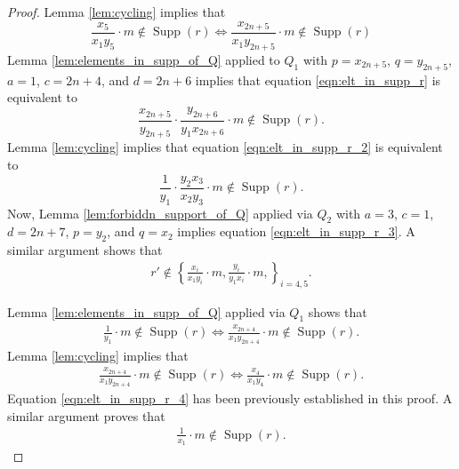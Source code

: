 \documentclass[12pt,a4paper]{amsart}
\theoremstyle{plain}
\theoremstyle{definition}
\def\bproof{\begin{proof}}
\def\eproof{\end{proof}}
\theoremstyle{remark}
\DeclareMathOperator{\Supp}{Supp}
\begin{document}
\bproof
Lemma \ref{lem:cycling} implies that
\begin{equation}
    \label{eqn:elt_in_supp_r}
    \frac{x_{5}}{x_{1}y_{5}} \cdot m \notin \Supp(r) \iff \frac{x_{2n+5}}{x_{1}y_{2n+5}} \cdot m \notin \Supp(r)
\end{equation}
Lemma \ref{lem:elements_in_supp_of_Q} applied to $Q_{1}$ with $p = x_{2n+5}$, $q = y_{2n+5}$, $a = 1$, $c = 2n+4$, and $d = 2n+6$ implies that equation \eqref{eqn:elt_in_supp_r} is equivalent to 
\begin{equation}
    \label{eqn:elt_in_supp_r_2}
    \frac{x_{2n+5}}{y_{2n+5}}\cdot  \frac{y_{2n+6}}{y_{1}x_{2n+6}} \cdot m \notin \Supp(r).
\end{equation}
Lemma \ref{lem:cycling} implies that equation \eqref{eqn:elt_in_supp_r_2} is equivalent to 
\begin{equation}
    \label{eqn:elt_in_supp_r_3}
    \frac{1}{y_{1}} \cdot \frac{y_{2}x_{3}}{x_{2}y_{3}} \cdot m \notin \Supp(r).
\end{equation}
Now, Lemma \ref{lem:forbiddn_support_of_Q} applied via $Q_{2}$ with $a = 3$, $c =1$, $d = 2n+7$, $p = y_{2}$, and $q = x_{2}$ implies equation \eqref{eqn:elt_in_supp_r_3}. A similar argument shows that
\begin{align*}
    r' \notin \left \{\frac{x_{i}}{x_{1}y_{i}} \cdot m, \frac{y_{i}}{y_{1}x_{i}} \cdot m, \right \}_{i=4,5}.
\end{align*}

Lemma \ref{lem:elements_in_supp_of_Q} applied via $Q_{1}$ shows that 
\begin{align*}
    \frac{1}{y_{1}} \cdot m \notin \Supp(r) \iff \frac{x_{2n+4}}{x_{1}y_{2n+4}} \cdot m \notin \Supp(r).
\end{align*}
Lemma \ref{lem:cycling} implies that 
\begin{equation}
\label{eqn:elt_in_supp_r_4}
\begin{aligned}
    \frac{x_{2n+4}}{x_{1}y_{2n+4}} \cdot m \notin \Supp(r)  \iff \frac{x_{4}}{x_{1}y_{4}} \cdot m \notin \Supp(r).
\end{aligned}
\end{equation}
Equation \eqref{eqn:elt_in_supp_r_4} has been previously established in this proof. A similar argument proves that 
\begin{align*}
    \frac{1}{x_{1}} \cdot m \notin \Supp(r).
\end{align*}
\eproof 
\end{document}
